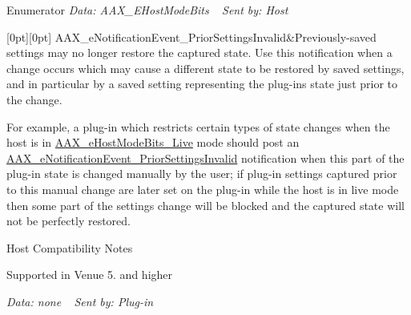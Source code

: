 \begin{DoxyEnumFields}{Enumerator}
{\itshape Data\+: A\+A\+X\+\_\+\+E\+Host\+Mode\+Bits} ~\newline
 {\itshape Sent by\+: Host} \\
\hline

[0pt][0pt]{}\mbox{\label{a00491_afab5ea2cfd731fc8f163b6caa685406ea40644990a3de0fec1f25929b535f7760}} 
A\+A\+X\+\_\+e\+Notification\+Event\+\_\+\+Prior\+Settings\+Invalid&Previously-\/saved settings may no longer restore the captured state. Use this notification when a change occurs which may cause a different state to be restored by saved settings, and in particular by a saved setting representing the plug-\/in\textquotesingle{}s state just prior to the change.

For example, a plug-\/in which restricts certain types of state changes when the host is in \mbox{\hyperlink{a00491_aa3c8056a6ce601cc3367cb7d4478e9daa83555a8ed532fa43f3583af95ca3d39b}{A\+A\+X\+\_\+e\+Host\+Mode\+Bits\+\_\+\+Live}} mode should post an \mbox{\hyperlink{a00491_afab5ea2cfd731fc8f163b6caa685406ea40644990a3de0fec1f25929b535f7760}{A\+A\+X\+\_\+e\+Notification\+Event\+\_\+\+Prior\+Settings\+Invalid}} notification when this part of the plug-\/in state is changed manually by the user; if plug-\/in settings captured prior to this manual change are later set on the plug-\/in while the host is in live mode then some part of the settings change will be blocked and the captured state will not be perfectly restored.

\begin{DoxyRefDesc}{Host Compatibility Notes}
\item[\mbox{\hyperlink{a00786__compatibility_notes000046}{Host Compatibility Notes}}]Supported in Venue 5. and higher\end{DoxyRefDesc}


{\itshape Data\+: none} ~\newline
 {\itshape Sent by\+: Plug-\/in} \\
\hline

\end{DoxyEnumFields}
\mbox{\label{a00491_aa3c8056a6ce601cc3367cb7d4478e9da}} 
